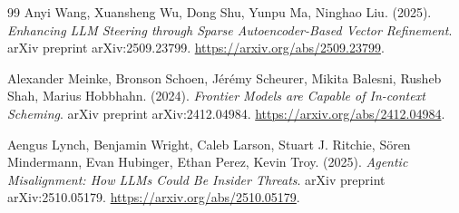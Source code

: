 \documentclass[10pt,a4paper]{article}
\begin{document}
\begin{thebibliography}{99}
Anyi Wang, Xuansheng Wu, Dong Shu, Yunpu Ma, Ninghao Liu. (2025). \textit{Enhancing LLM Steering through Sparse Autoencoder-Based Vector Refinement}. arXiv preprint arXiv:2509.23799. \url{https://arxiv.org/abs/2509.23799}.

Alexander Meinke, Bronson Schoen, Jérémy Scheurer, Mikita Balesni, Rusheb Shah, Marius Hobbhahn. (2024). \textit{Frontier Models are Capable of In-context Scheming}. arXiv preprint arXiv:2412.04984. \url{https://arxiv.org/abs/2412.04984}.

Aengus Lynch, Benjamin Wright, Caleb Larson, Stuart J. Ritchie, Sören Mindermann, Evan Hubinger, Ethan Perez, Kevin Troy. (2025). \textit{Agentic Misalignment: How LLMs Could Be Insider Threats}. arXiv preprint arXiv:2510.05179. \url{https://arxiv.org/abs/2510.05179}.

\end{thebibliography}
\end{document}
